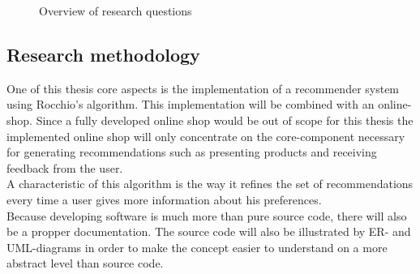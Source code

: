 \begin{figure}[h!]

    \caption{Overview of research questions}
    \label{fig:research-questions}

\end{figure}





\subsection{Research methodology}
One of this thesis core aspects is the implementation of a recommender system using Rocchio's algorithm.
This implementation will be combined with an online-shop.
Since a fully developed online shop would be out of scope for this thesis the implemented online shop will only concentrate on the core-component necessary for generating recommendations such as presenting products and receiving feedback from the user.\\
A characteristic of this algorithm is the way it refines the set of recommendations every time a user gives more information about his preferences.\citep[p. 92]{lops:2011}
\\
Because developing software is much more than pure source code, there will also be a propper documentation.
The source code will also be illustrated by ER- and UML-diagrams in order to make the concept easier to understand on a more abstract level than source code.

